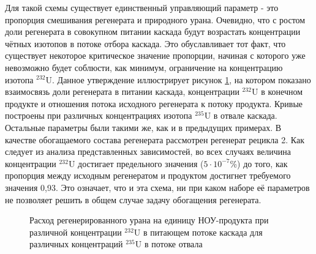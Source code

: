Для такой схемы существует единственный управляющий параметр - это пропорция смешивания регенерата и природного урана. Очевидно, что с ростом доли регенерата в совокупном питании каскада будут возрастать концентрации чётных изотопов в потоке отбора каскада. Это обуславливает тот факт, что существует некоторое критическое значение пропорции, начиная с которого уже невозможно будет соблюсти, как минимум, ограничение на концентрацию изотопа $^{232}$U. Данное утверждение иллюстрирует рисунок \ref{sc3_1.second}, на котором показано взаимосвязь доли регенерата в питании каскада, концентрации $^{232}$U в конечном продукте и отношения потока исходного регенерата к потоку продукта. Кривые построены при различных концентрациях изотопа $^{235}$U в отвале каскада. Остальные параметры были такими же, как и в предыдущих примерах. В качестве обогащаемого состава регенерата рассмотрен регенерат рецикла 2. Как следует из анализа представленных зависимостей, во всех случаях величина концентрации  $^{232}$U достигает предельного значения ($5\cdot10^{-7}$\%) до того, как пропорция между исходным регенератом и продуктом достигнет требуемого значения 0,93. Это означает, что и эта схема, ни при каком наборе её параметров не позволяет решить в общем случае задачу обогащения регенерата. 

\begin{figure}[ht]
  \caption{Расход регенерированного урана на единицу НОУ-продукта  при различной концентрации $^{232}$U в питающем потоке каскада для различных концентраций $^{235}$U в потоке отвала}\label{sc3_1.second}
\end{figure}


